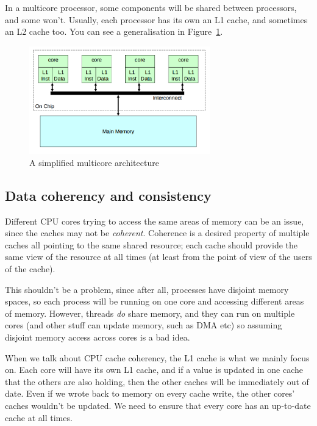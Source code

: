 In a multicore processor, some components will be shared between processors, and
some won't. Usually, each processor has its own an L1 cache, and sometimes an L2
cache too. You can see a generalisation in Figure~\ref{multicore-arch}.

\begin{figure}
  \centering
  \includegraphics[width=0.7\textwidth]{images/multicore-arch}
  \caption{A simplified multicore architecture}
  \label{multicore-arch}
\end{figure}

\subsection{Data coherency and consistency}

Different CPU cores trying to access the same areas of memory can be an issue,
since the caches may not be \textit{coherent}. Coherence is a desired property
of multiple caches all pointing to the same shared resource; each cache should
provide the same view of the resource at all times (at least from the point of
view of the users of the cache).

This shouldn't be a problem, since after all, processes have disjoint memory
spaces, so each process will be running on one core and accessing different
areas of memory. However, threads \textit{do} share memory, and they can run on
multiple cores (and other stuff can update memory, such as DMA etc) so assuming
disjoint memory access across cores is a bad idea.

When we talk about CPU cache coherency, the L1 cache is what we mainly focus on.
Each core will have its own L1 cache, and if a value is updated in one cache
that the others are also holding, then the other caches will be immediately out
of date. Even if we wrote back to memory on every cache write, the other cores'
caches wouldn't be updated. We need to ensure that every core has an up-to-date
cache at all times.

